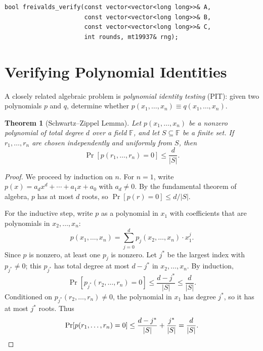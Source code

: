 \documentclass[twoside,12pt]{book}
\theoremstyle{plain}
\newtheorem{theorem}{Theorem}[chapter]
\theoremstyle{definition}
\theoremstyle{remark}
\newenvironment{cpplisting}{\begin{center}\small}{\end{center}}
\begin{document}
\begin{cpplisting}
\begin{lstlisting}[title={Freivalds' algorithm --- \texttt{src/chapter8/freivalds.h}}]
bool freivalds_verify(const vector<vector<long long>>& A,
                      const vector<vector<long long>>& B,
                      const vector<vector<long long>>& C,
                      int rounds, mt19937& rng);
\end{lstlisting}
\end{cpplisting}


\section{Verifying Polynomial Identities}
\label{sec:poly-identity}

A closely related algebraic problem is \emph{polynomial identity testing} (PIT): given two polynomials $p$ and $q$, determine whether $p(x_1, \ldots, x_n) \equiv q(x_1, \ldots, x_n)$.

\begin{theorem}[Schwartz--Zippel Lemma]
\label{thm:schwartz-zippel}
Let $p(x_1, \ldots, x_n)$ be a nonzero polynomial of total degree $d$ over a field $\mathbb{F}$, and let $S \subseteq \mathbb{F}$ be a finite set. If $r_1, \ldots, r_n$ are chosen independently and uniformly from $S$, then
\[
\Pr[p(r_1, \ldots, r_n) = 0] \leq \frac{d}{|S|}.
\]
\end{theorem}

\begin{proof}
We proceed by induction on $n$. For $n = 1$, write $p(x) = a_d x^d + \cdots + a_1 x + a_0$ with $a_d \neq 0$. By the fundamental theorem of algebra, $p$ has at most $d$ roots, so $\Pr[p(r) = 0] \leq d/|S|$.

For the inductive step, write $p$ as a polynomial in $x_1$ with coefficients that are polynomials in $x_2, \ldots, x_n$:
\[
p(x_1, \ldots, x_n) = \sum_{j=0}^{d} p_j(x_2, \ldots, x_n) \cdot x_1^j.
\]
Since $p$ is nonzero, at least one $p_j$ is nonzero. Let $j^*$ be the largest index with $p_{j^*} \neq 0$; this $p_{j^*}$ has total degree at most $d - j^*$ in $x_2, \ldots, x_n$. By induction,
\[
\Pr[p_{j^*}(r_2, \ldots, r_n) = 0] \leq \frac{d - j^*}{|S|} \leq \frac{d}{|S|}.
\]
Conditioned on $p_{j^*}(r_2, \ldots, r_n) \neq 0$, the polynomial in $x_1$ has degree $j^*$, so it has at most $j^*$ roots. Thus
\[
\Pr[p(r_1, \ldots, r_n) = 0] \leq \frac{d - j^*}{|S|} + \frac{j^*}{|S|} = \frac{d}{|S|}.\qedhere
\]
\end{proof}
\end{document}

